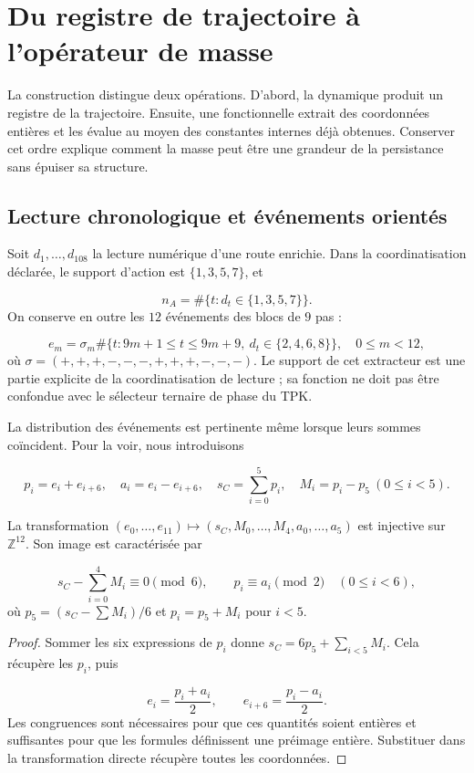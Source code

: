 \section{Du registre de trajectoire à l’opérateur de masse
}
\label{vi:sec:operador-masa}

La construction distingue deux opérations. D’abord, la dynamique produit
un registre de la trajectoire. Ensuite, une fonctionnelle extrait des coordonnées
entières et les évalue au moyen des constantes internes déjà obtenues.
Conserver cet ordre explique comment la masse peut être une grandeur de la
persistance sans épuiser sa structure.


\subsection{Lecture chronologique et événements orientés
}

Soit \(d_1,\ldots,d_{108}\) la lecture numérique d’une route enrichie.
Dans la coordinatisation déclarée, le support d’action est \(\{1,3,5,7\}\), et

\[
 n_A=\#\{t:d_t\in\{1,3,5,7\}\}.
\]
On conserve en outre les \(12\) événements des blocs de \(9\) pas :

\[
 e_m=\sigma_m\#\{t:9m+1\le t\le9m+9,\ d_t\in\{2,4,6,8\}\},
 \quad 0\le m<12,
\]
où \(\sigma=(+,+,+,-,-,-,+,+,+,-,-,-)\). Le support de cet
extracteur est une partie explicite de la coordinatisation de lecture ; sa fonction ne
doit pas être confondue avec le sélecteur ternaire de phase du TPK.


La distribution des événements est pertinente même lorsque leurs sommes
coïncident. Pour la voir, nous introduisons

\[
 p_i=e_i+e_{i+6},\quad a_i=e_i-e_{i+6},\quad
 s_C=\sum_{i=0}^{5}p_i,\quad M_i=p_i-p_5\ (0\le i<5).
\]

\begin{proposition}
\label{vi:prop:eventos}
La transformation \((e_0,\ldots,e_{11})\mapsto(s_C,M_0,\ldots,M_4,a_0,\ldots,a_5)\)
est injective sur \(\mathbb Z^{12}\). Son image est caractérisée par

\[
 s_C-\sum_{i=0}^4M_i\equiv0\pmod6,
 \qquad p_i\equiv a_i\pmod2\quad(0\le i<6),
\]
où \(p_5=(s_C-\sum M_i)/6\) et \(p_i=p_5+M_i\) pour \(i<5\).

\end{proposition}
\begin{proof}
Sommer les six expressions de \(p_i\) donne
\(s_C=6p_5+\sum_{i<5}M_i\). Cela récupère les \(p_i\), puis

\[
 e_i=\frac{p_i+a_i}{2},\qquad
 e_{i+6}=\frac{p_i-a_i}{2}.
\]
Les congruences sont nécessaires pour que ces quantités soient entières et
suffisantes pour que les formules définissent une préimage entière. Substituer
dans la transformation directe récupère toutes les coordonnées.

\end{proof}

